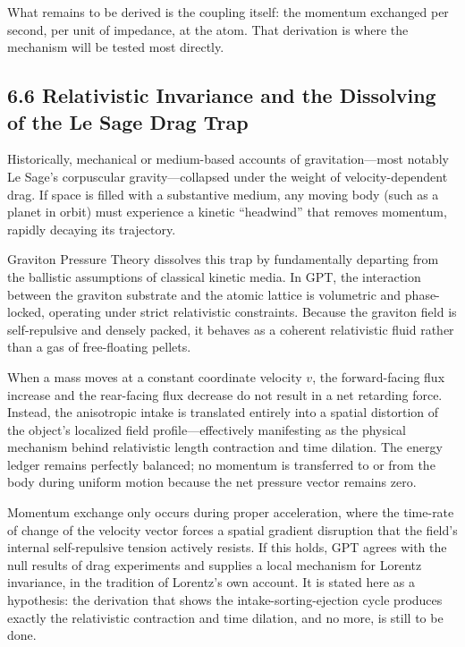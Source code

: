 \documentclass[11pt]{article}
\begin{document}
What remains to be derived is the coupling itself: the momentum exchanged per second, per unit of impedance, at the atom. That derivation is where the mechanism will be tested most directly.

\subsection{6.6 Relativistic Invariance and the Dissolving of the Le Sage Drag Trap}

Historically, mechanical or medium-based accounts of gravitation---most notably Le Sage's corpuscular gravity---collapsed under the weight of velocity-dependent drag. If space is filled with a substantive medium, any moving body (such as a planet in orbit) must experience a kinetic ``headwind'' that removes momentum, rapidly decaying its trajectory.

Graviton Pressure Theory dissolves this trap by fundamentally departing from the ballistic assumptions of classical kinetic media. In GPT, the interaction between the graviton substrate and the atomic lattice is volumetric and phase-locked, operating under strict relativistic constraints. Because the graviton field is self-repulsive and densely packed, it behaves as a coherent relativistic fluid rather than a gas of free-floating pellets.

When a mass moves at a constant coordinate velocity \(v\), the forward-facing flux increase and the rear-facing flux decrease do not result in a net retarding force. Instead, the anisotropic intake is translated entirely into a spatial distortion of the object's localized field profile---effectively manifesting as the physical mechanism behind relativistic length contraction and time dilation. The energy ledger remains perfectly balanced; no momentum is transferred to or from the body during uniform motion because the net pressure vector remains zero.

Momentum exchange only occurs during proper acceleration, where the time-rate of change of the velocity vector forces a spatial gradient disruption that the field's internal self-repulsive tension actively resists. If this holds, GPT agrees with the null results of drag experiments and supplies a local mechanism for Lorentz invariance, in the tradition of Lorentz's own account. It is stated here as a hypothesis: the derivation that shows the intake-sorting-ejection cycle produces exactly the relativistic contraction and time dilation, and no more, is still to be done.
\end{document}
